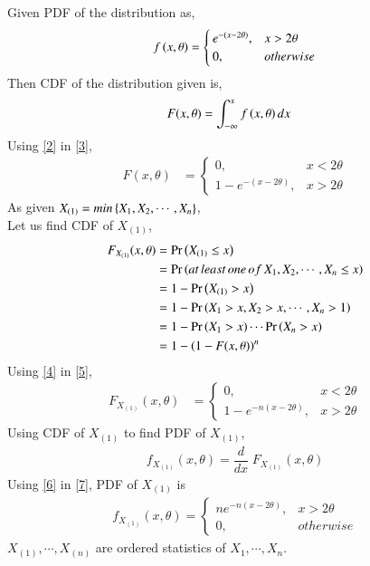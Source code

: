\documentclass[journal,12pt,twocolumn]{IEEEtran}
\begin{document}
Given PDF of the distribution as,
\begin{align}
f\left({x,\theta}\right)=
\begin{cases}
e^{-(x-2\theta)}, & x>2\theta
\\
0, & otherwise
\end{cases}\label{2}
\end{align}
Then CDF of the distribution given is,
\begin{align}
    F(x,\theta)&=\int_{-\infty}^x f\left({x,\theta}\right) dx\label{3}
\end{align}
Using \eqref{2} in \eqref{3},
\begin{align}
F(x,\theta)&=
\begin{cases}
0, & x<2\theta
\\
1-e^{-(x-2\theta)}, & x>2\theta
\end{cases}\label{4}
\end{align}
As given $X_{(1)}=min\left\{X_1,X_2,\cdots,X_n\right\}$,\\
Let us find CDF of $X_{(1)}$,
\begin{align}
  \nonumber  F_{X_{(1)}}(x,\theta)&=\Pr\left(X_{(1)}\le x\right)\\
  \nonumber  &=\Pr\left(at\,least\,one\, of\, X_1,X_2,\cdots,X_n \le x\right)\\
 \nonumber   &=1-\Pr\left(X_{(1)}>x\right)\\
  \nonumber  &=1-\Pr\left(X_1>x,X_2>x,\cdots,X_n>1\right)\\
  \nonumber &=1-\Pr\left(X_1>x\right)\cdots \Pr\left(X_n>x\right)\\
    &=1-\left(1-F(x,\theta)\right)^n\label{5}
\end{align}
Using \eqref{4} in \eqref{5},
\begin{align}
F_{X_{(1)}}(x,\theta)&=
\begin{cases}
0, & x<2\theta
\\
1-e^{-n(x-2\theta)}, & x>2\theta
\end{cases}\label{6}
\end{align}
Using CDF of $X_{(1)}$ to find PDF of ${X_{(1)}}$,
\begin{align}
    f_{X_{(1)}}(x,\theta)= \dfrac{d}{dx}\;F_{X_{(1)}}(x,\theta)\label{7}
\end{align}
Using \eqref{6} in \eqref{7}, PDF of $X_{(1)}$ is
\begin{align}
f_{X_{(1)}}{(x,\theta)}=
\begin{cases}
n e^{-n(x-2\theta)}, & x>2\theta
\\
0, & otherwise
\end{cases}\label{8}
\end{align}
$X_{(1)},\cdots,X_{(n)}$ are ordered statistics of $X_1,\cdots,X_n$.
\end{document}
